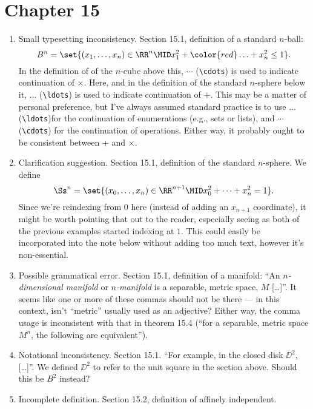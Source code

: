 \documentclass{fkletter}
\begin{document}
\section*{Chapter 15}
\begin{enumerate}
  \item Small typesetting inconsistency. Section 15.1, definition of a standard
    $n$-ball:
    \[
      B^n = \set{(x_1, \ldots, x_n) \in \RR^n \MID x_1^2 + {\color{red} \ldots}
        + x_n^2 \leq 1}.
    \]
    In the definition of of the $n$-cube above this, $\cdots$
    (\verb|\cdots|) is used to indicate continuation of $\times$. Here, and in
    the definition of the standard $n$-sphere below it, $\ldots$ (\verb|\ldots|)
    is used to indicate continuation of $+$. This may be a matter of personal
    preference, but I've always assumed standard practice is to use $\ldots$
    (\verb|\ldots|)for the continuation of enumerations (e.g., sets or lists),
    and $\cdots$ (\verb|\cdots|) for the continuation of operations. Either way,
    it probably ought to be consistent between $+$ and $\times$.
  \item Clarification suggestion. Section 15.1, definition of the standard
    $n$-sphere. We define
    \[
      \Ss^n = \set{(x_0, \ldots, x_n) \in \RR^{n+1} \MID x_0^2 + \cdots + x_n^2
        = 1}.
    \]
    Since we're reindexing from $0$ here (instead of adding an $x_{n+1}$
    coordinate), it might be worth pointing that out to the reader, especially
    seeing as both of the previous examples started indexing at $1$. This could
    easily be incorporated into the note below without adding too much text,
    however it's non-essential.
  \item Possible grammatical error. Section 15.1, definition of a manifold: ``An
    \emph{$n$-dimensional manifold} or \emph{$n$-manifold} is a {\color{red}
      separable, metric space, $M$} [\ldots]''. It seems like one or more of
    these commas should not be there --- in this context, isn't ``metric'' usually
    used as an adjective? Either way, the comma usage is inconsistent with that
    in theorem 15.4 (``for a separable, metric space $M^n$, the following are
    equivalent'').
  \item Notational inconsistency. Section 15.1. ``For example, in the
    {\color{red} closed disk $\DD^2$}, [\ldots]''. We defined $\DD^2$ to refer
    to the unit square in the section above. Should this be $B^2$ instead?
  \item Incomplete definition. Section 15.2, definition of affinely independent.

\end{enumerate}
\end{document}
